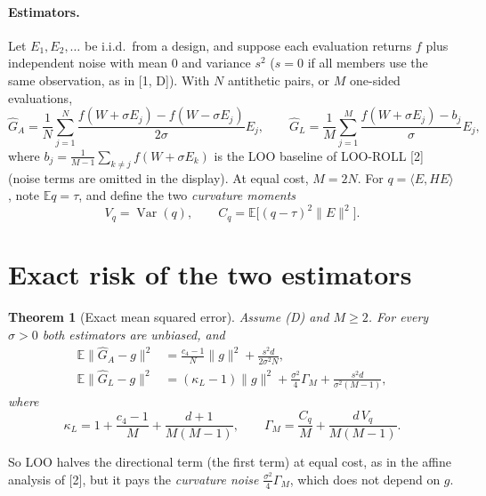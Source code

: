 \documentclass[11pt]{article}
\newtheorem{theorem}{Theorem}
\theoremstyle{remark}
\newcommand{\E}{\mathbb{E}}
\newcommand{\ip}[2]{\langle #1,#2\rangle}
\DeclareMathOperator{\Var}{Var}
\newcommand{\Gh}{\widehat G}
\begin{document}
\paragraph{Estimators.} Let $E_1,E_2,\dots$ be i.i.d.\ from a design, and suppose each evaluation returns $f$ plus independent noise with mean $0$ and variance $s^2$ ($s=0$ if all members use the same observation, as in [1, D]). With $N$ antithetic pairs, or $M$ one-sided evaluations,
\[
\Gh_A=\frac1N\sum_{j=1}^N\frac{f(W+\sigma E_j)-f(W-\sigma E_j)}{2\sigma}E_j,\qquad
\Gh_L=\frac1M\sum_{j=1}^M\frac{f(W+\sigma E_j)-b_j}{\sigma}E_j,
\]
where $b_j=\frac1{M-1}\sum_{k\ne j}f(W+\sigma E_k)$ is the LOO baseline of LOO-ROLL [2] (noise terms are omitted in the display). At equal cost, $M=2N$. For $q=\ip{E}{HE}$, note $\E q=\tau$, and define the two \emph{curvature moments}
\[
V_q=\Var(q),\qquad C_q=\E\big[(q-\tau)^2\|E\|^2\big].
\]

\section{Exact risk of the two estimators}
\begin{theorem}[Exact mean squared error]\label{thm:mse}
Assume (D) and $M\ge2$. For every $\sigma>0$ both estimators are unbiased, and
\begin{align}
\E\|\Gh_A-g\|^2&=\frac{c_4-1}{N}\|g\|^2+\frac{s^2d}{2\sigma^2N},\label{eq:anti}\\
\E\|\Gh_L-g\|^2&=(\kappa_L-1)\|g\|^2+\frac{\sigma^2}{4}\Gamma_M+\frac{s^2d}{\sigma^2(M-1)},\label{eq:loo}
\end{align}
where
\[
\kappa_L=1+\frac{c_4-1}{M}+\frac{d+1}{M(M-1)},\qquad \Gamma_M=\frac{C_q}{M}+\frac{d\,V_q}{M(M-1)} .
\]
\end{theorem}
So LOO halves the directional term (the first term) at equal cost, as in the affine analysis of [2], but it pays the \emph{curvature noise} $\frac{\sigma^2}{4}\Gamma_M$, which does not depend on $g$.
\end{document}
